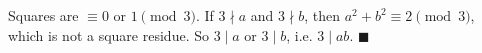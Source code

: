 Squares are $\equiv0$ or $1\pmod3$. If $3\nmid a$ and $3\nmid b$, then $a^2+b^2\equiv2\pmod3$, which is not a square residue. So $3\mid a$ or $3\mid b$, i.e. $3\mid ab$. $\blacksquare$

